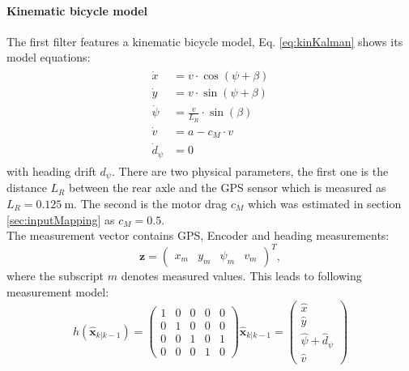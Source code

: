 \paragraph{Kinematic bicycle model} The first filter features a kinematic bicycle model, Eq. \eqref{eq:kinKalman} shows its model equations:
\begin{align}
\begin{split}\label{eq:kinKalman}
    \dot x &= v \cdot \cos (\psi + \beta)\\
    \dot y &= v \cdot \sin (\psi + \beta)\\
    \dot \psi &= \frac{v}{L_R}\cdot\sin(\beta)\\
    \dot v &= a - c_M\cdot v\\
    \dot d_\psi &= 0
\end{split}
\end{align}
with heading drift $d_\psi$.
There are two physical parameters, the first one is the distance $L_R$ between the rear axle and the GPS sensor which is measured as $L_R=\SI{0.125}{\meter}$. The second is the motor drag $c_M$ which was estimated in section \ref{sec:inputMapping} as $c_M=0.5$.\\
The measurement vector contains GPS, Encoder and heading measurements:
\begin{equation}
\bm{z} = \begin{pmatrix}
x_m&y_m&\psi_m&v_m
\end{pmatrix}^T,
\end{equation}
where the subscript $m$ denotes measured values. This leads to following measurement model:
\begin{equation}
h(\hat{\bm{x}}_{k|k-1}) = \begin{pmatrix}
1 & 0 & 0 & 0 & 0\\
0 & 1 & 0 & 0 & 0\\
0 & 0 & 1 & 0 & 1\\
0 & 0 & 0 & 1 & 0
\end{pmatrix} \hat{\bm{x}}_{k|k-1}=
\begin{pmatrix}
\hat x\\
\hat y\\
\hat \psi + \hat d_\psi\\
\hat v
\end{pmatrix}
\end{equation} 
